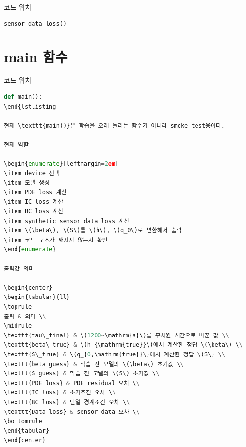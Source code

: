 \documentclass[11pt]{article}
\begin{document}
코드 위치

\begin{lstlisting}[language=Python]
sensor_data_loss()
\end{lstlisting}

\section{main 함수}

코드 위치

\begin{lstlisting}[language=Python]
def main():
\end{lstlisting

현재 \texttt{main()}은 학습을 오래 돌리는 함수가 아니라 smoke test용이다.

현재 역할

\begin{enumerate}[leftmargin=2em]
\item device 선택
\item 모델 생성
\item PDE loss 계산
\item IC loss 계산
\item BC loss 계산
\item synthetic sensor data loss 계산
\item \(\beta\), \(S\)를 \(h\), \(q_0\)로 변환해서 출력
\item 코드 구조가 깨지지 않는지 확인
\end{enumerate}

출력값 의미

\begin{center}
\begin{tabular}{ll}
\toprule
출력 & 의미 \\
\midrule
\texttt{tau\_final} & \(1200~\mathrm{s}\)를 무차원 시간으로 바꾼 값 \\
\texttt{beta\_true} & \(h_{\mathrm{true}}\)에서 계산한 정답 \(\beta\) \\
\texttt{S\_true} & \(q_{0,\mathrm{true}}\)에서 계산한 정답 \(S\) \\
\texttt{beta guess} & 학습 전 모델의 \(\beta\) 초기값 \\
\texttt{S guess} & 학습 전 모델의 \(S\) 초기값 \\
\texttt{PDE loss} & PDE residual 오차 \\
\texttt{IC loss} & 초기조건 오차 \\
\texttt{BC loss} & 단열 경계조건 오차 \\
\texttt{Data loss} & sensor data 오차 \\
\bottomrule
\end{tabular}
\end{center}


\end{lstlisting}
\end{document}
